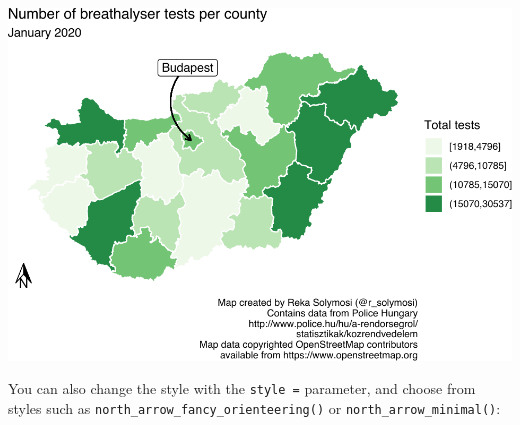 \documentclass[
]{book}
\begin{document}
\includegraphics{crime_mapping_files/figure-latex/orientation-1.pdf}

You can also change the style with the \texttt{style\ =} parameter, and choose from styles such as \texttt{north\_arrow\_fancy\_orienteering()} or \texttt{north\_arrow\_minimal()}:
\end{document}
